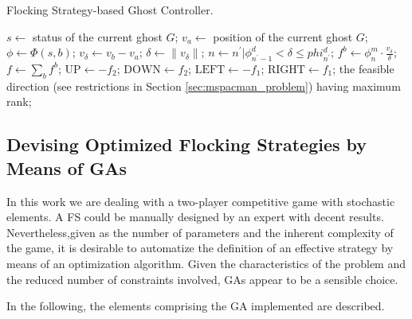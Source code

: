 \documentclass{llncs}
\begin{document}
\begin{algorithm}[ht]
\caption{Flocking Strategy-based Ghost Controller.}
\label{alg:FS_Controller} 
\begin{algorithmic}
\STATE $s\gets$ status of the current ghost $G$;
\STATE $v_a\gets$ position of the current ghost $G$;
	\STATE $\phi\gets\Phi(s,b)$; 
	\STATE $v_\delta\gets v_b-v_a$; 
	\STATE $\delta\gets\|v_\delta\|$; 
	\STATE $n\gets n^\prime|\phi^d_{n^\prime-1} < \delta \leq phi^d_{n^\prime}$; 
	\STATE $f^{b}\gets\phi^m_n \cdot \frac{v_\delta}{\delta}$; 
\ENDFOR
\STATE $f\gets\sum_b f^b$; 
\STATE {}
\STATE $\mathrm{UP}\gets- f_2$;
\STATE $\mathrm{DOWN}\gets f_2$;
\STATE $\mathrm{LEFT}\gets- f_1$;
\STATE $\mathrm{RIGHT}\gets f_1$;
\RETURN the feasible direction (see restrictions in Section \ref{sec:mspacman_problem}) having maximum rank;
\end{algorithmic}
\end{algorithm}


\subsection{Devising Optimized Flocking Strategies by Means of GAs}
\label{subsec:GAs_flocking}
In this work we are dealing with a two-player competitive game with stochastic elements. A FS could be manually designed by an expert with decent results. Nevertheless,given as the number of parameters and the inherent complexity of the game, it is desirable to automatize the definition of an effective strategy by means of an optimization algorithm. Given the characteristics of the problem and the reduced number of constraints involved, GAs appear to be a sensible choice. 

In the following, the elements comprising the GA implemented are described.
\end{document}
